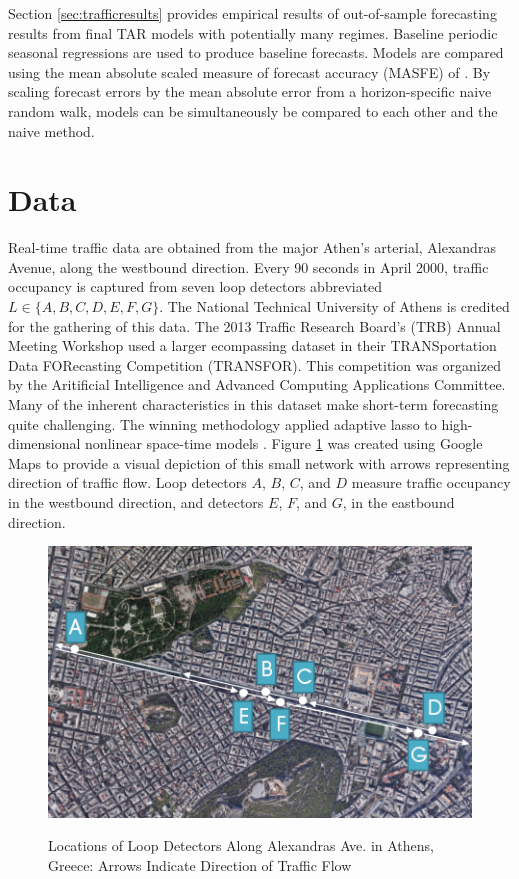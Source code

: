 Section \ref{sec:trafficresults} provides empirical results of out-of-sample forecasting results from final TAR models with potentially many regimes. Baseline periodic seasonal regressions are used to produce baseline forecasts. Models are compared using the mean absolute scaled measure of forecast accuracy (MASFE) of \cite{Hyndman2006}. By scaling forecast errors by the mean absolute error from a horizon-specific naive random walk, models can be simultaneously be compared to each other and the naive method.






\section{Data}
\label{sec:trafficdata}

Real-time traffic data are obtained from the major Athen's arterial, Alexandras Avenue, along the westbound direction. Every 90 seconds in April 2000, traffic occupancy is captured from seven loop detectors abbreviated $L \in \{A,B,C,D,E,F,G\}$. The National Technical University of Athens is credited for the gathering of this data. The 2013 Traffic Research Board's (TRB) Annual Meeting Workshop used a larger ecompassing dataset in their TRANSportation Data FORecasting Competition (TRANSFOR). This competition was organized by the Aritificial Intelligence and Advanced Computing Applications Committee.  Many of the inherent characteristics in this dataset make short-term forecasting quite challenging. The winning methodology applied adaptive lasso to high-dimensional nonlinear space-time models \citep{Kamarianakis2012}. Figure \ref{fig:trafficdatamap} was created using Google Maps to provide a visual depiction of this small network with arrows representing direction of traffic flow. Loop detectors $A$, $B$, $C$, and $D$ measure traffic occupancy in the westbound direction, and detectors $E$, $F$, and $G$, in the eastbound direction.

\begin{figure}[htbp]
\caption{Locations of Loop Detectors Along Alexandras Ave. in Athens, Greece: Arrows Indicate Direction of Traffic Flow}
\includegraphics[width=\textwidth]{TrafficMap2}
\label{fig:trafficdatamap}
\end{figure}

